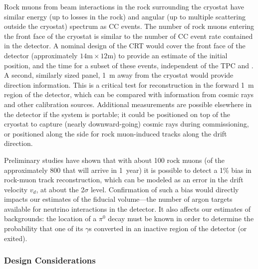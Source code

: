 Rock muons from beam interactions in the rock surrounding the cryostat
have similar energy (up to losses in the rock) and angular
(up to multiple scattering outside the cryostat) spectrum as CC \numu %
events. The number of rock muons entering the front face of the cryostat is similar to the number of CC \numu event rate contained in the detector.  A nominal design of the CRT would cover the front face of the detector (approximately $14\textrm{m} \times 12\textrm{m}$) to provide an estimate of the initial position, and the time for a subset of these events, independent of the TPC and . %
A second, similarly sized panel, \SI{1}{\m} away from the cryostat would provide direction information. This is a critical test for reconstruction in the forward \SI{1}{\m} region of the detector, which can be compared with information from cosmic rays and other calibration sources. Additional measurements are possible elsewhere in the detector if the system is portable; it could be %
positioned on top of the cryostat to capture (nearly downward-going) cosmic rays during commissioning, or positioned along the side %
for rock muon-induced tracks along the drift direction. 

Preliminary studies have shown that with about \num{100} rock muons (of the approximately \num{800} that will arrive in \num{1}~year) it is possible to %
detect a \num{1}\% bias in rock-muon track reconstruction, which can be modeled as an error in the drift velocity $v_d$, at about the \num{2}$\sigma$ level.  %
Confirmation of such a bias would directly impacts our estimates of the fiducial volume---the number of argon targets available for neutrino interactions in the detector. It also affects our estimates of backgrounds: %
the location of a $\pi^0$ decay must be known in order to %
determine the probability that one of
its $\gamma$s converted in an inactive region of the detector (or exited). %

\subsubsection{Design Considerations}


